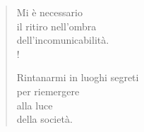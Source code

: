 
\begin{verse}
    Mi è necessario\\
    il ritiro nell'ombra\\
    dell'incomunicabilità.\\!
    
    Rintanarmi in luoghi segreti\\
    per riemergere\\
    alla luce\\
    della società.    
\end{verse}